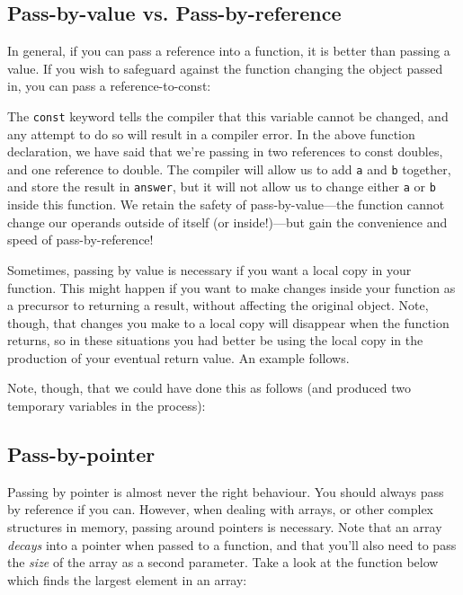 \documentclass[a4paper]{scrartcl}
\begin{document}
\subsection{Pass-by-value vs. Pass-by-reference}
In general, if you can pass a reference into a function, it is better than passing a value. If you wish to safeguard against the function changing the object passed in, you can pass a reference-to-const:



The \texttt{const} keyword tells the compiler that this variable cannot be changed, and any attempt to do so will result in a compiler error. In the above function declaration, we have said that we're passing in two references to const doubles, and one reference to double. The compiler will allow us to add \verb|a| and \verb|b| together, and store the result in \verb|answer|, but it will not allow us to change either \verb|a| or \verb|b| inside this function. We retain the safety of pass-by-value---the function cannot change our operands outside of itself (or inside!)---but gain the convenience and speed of pass-by-reference!

Sometimes, passing by value is necessary if you want a local copy in your function. This might happen if you want to make changes inside your function as a precursor to returning a result, without affecting the original object. Note, though, that changes you make to a local copy will disappear when the function returns, so in these situations you had better be using the local copy in the production of your eventual return value. An example follows.



Note, though, that we could have done this as follows (and produced two temporary variables in the process):



\subsection{Pass-by-pointer}
Passing by pointer is almost never the right behaviour. You should always pass by reference if you can. However, when dealing with arrays, or other complex structures in memory, passing around pointers is necessary. Note that an array \emph{decays} into a pointer when passed to a function, and that you'll also need to pass the \emph{size} of the array as a second parameter. Take a look at the function below which finds the largest element in an array:
\end{document}
